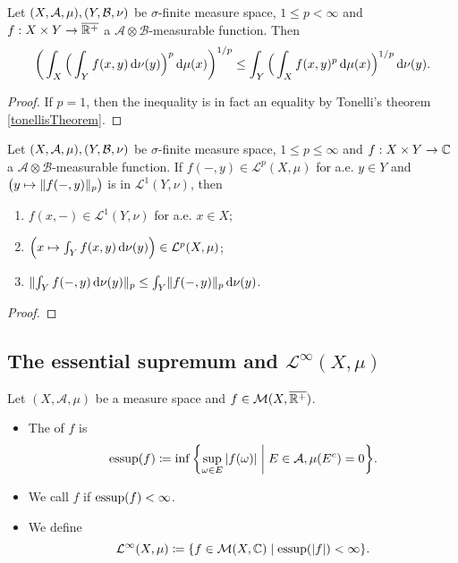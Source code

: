 \begin{theorem} \label{MinkowskisIntegralInequality}
Let $\sSet{X,\mathcal{A},\mu}, \sSet{Y,\mathcal{B},\nu}$ be $\sigma$-finite measure space, $1\leq p < \infty$ and $f: X\times Y\to \overline{\mathbb{R}^+}$ a $\mathcal{A}\otimes\mathcal{B}$-measurable function. Then
\[ \bigg(\int_X\Big(\int_Y f(x,y)\operatorname{d \!}{\nu}(y)\Big)^p\operatorname{d \!}{\mu}(x)\bigg)^{1/p} \leq \int_Y\Big(\int_X f(x,y)^p\operatorname{d \!}{\mu}(x)\Big)^{1/p}\operatorname{d \!}{\nu}(y). \]
\end{theorem}
\begin{proof}
If $p=1$, then the inequality is in fact an equality by Tonelli's theorem \ref{tonellisTheorem}.
\end{proof}
\begin{corollary}
Let $\sSet{X,\mathcal{A},\mu}, \sSet{Y,\mathcal{B},\nu}$ be $\sigma$-finite measure space, $1\leq p \leq \infty$ and $f: X\times Y\to \mathbb{C}$ a $\mathcal{A}\otimes\mathcal{B}$-measurable function. If $f(-,y)\in \mathcal{L}^p(X,\mu)$ for a.e. $y\in Y$ and $\big(y\mapsto \lVert f(-,y)\rVert_p\big)$ is in $\mathcal{L}^1(Y,\nu)$, then
\begin{enumerate}
\item $f(x,-)\in \mathcal{L}^1(Y,\nu)$ for a.e. $x\in X$;
\item $\Big(x\mapsto \int_Y f(x,y)\operatorname{d \!}{\nu}(y)\Big)\in \mathcal{L}^p(X,\mu)$;
\item $\lVert\int_Yf(-,y)\operatorname{d \!}{\nu}(y)\rVert_p \leq \int_Y\lVert f(-,y)\rVert_p\operatorname{d \!}{\nu}(y)$.
\end{enumerate}
\end{corollary}
\begin{proof}

\end{proof}

\subsection{The essential supremum and $\mathcal{L}^\infty(X,\mu)$}
\begin{definition}
Let $(X, \mathcal{A}, \mu)$ be a measure space and $f\in \operatorname{\mathcal{M}}(X, \overline{\mathbb{R}^+})$.
\begin{itemize}
\item The  of $f$ is
\[ \essup(f) \defeq \inf\setbuilder{\sup_{\omega\in E}|f(\omega)|}{E\in \mathcal{A}, \mu(E^c) = 0}. \]
\item We call $f$  if $\operatorname{essup}(f)<\infty$.
\item We define
\[ \mathcal{L}^\infty(X,\mu) \defeq \setbuilder{f\in \meas(X, \C)}{\essup(|f|) < \infty}. \]
\end{itemize}
\end{definition}

